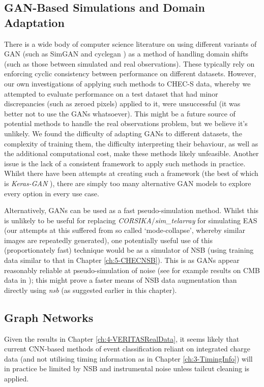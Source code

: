 \subsection{GAN-Based Simulations and Domain Adaptation}
There is a wide body of computer science literature on using different variants of GAN (such as SimGAN \cite{simgan} and cyclegan \cite{cyclegan}) as a method of handling domain shifts (such as those between simulated and real observations). These typically rely on enforcing cyclic consistency between performance on different datasets. However, our own investigations of applying such methods to CHEC-S data, whereby we attempted to evaluate performance on a test dataset that had minor discrepancies (such as zeroed pixels) applied to it, were unsuccessful (it was better not to use the GANs whatsoever). This might be a future source of potential methods to handle the real observations problem, but we believe it's unlikely. We found the difficulty of adapting GANs to different datasets, the complexity of training them, the difficulty interpreting their behaviour, as well as the additional computational cost, make these methods likely unfeasible. Another issue is the lack of a consistent framework to apply such methods in practice. Whilst there have been attempts at creating such a framework (the best of which is \textit{Keras-GAN} \cite{kerasgan}), there are simply too many alternative GAN models to explore every option in every use case. 

Alternatively, GANs can be used as a fast pseudo-simulation method. Whilst this is unlikely to be useful for replacing \textit{CORSIKA}/\textit{sim\_telarray} for simulating EAS (our attempts at this suffered from so called `mode-collapse', whereby similar images are repeatedly generated), one potentially useful use of this (proportionately fast) technique would be as a simulator of NSB (using training data similar to that in Chapter \ref{ch:5-CHECNSB}). This is as GANs appear reasonably reliable at pseudo-simulation of noise (see for example results on CMB data in \cite{darshgan}); this might prove a faster means of NSB data augmentation than directly using \textit{nsb} (as suggested earlier in this chapter). 

\subsection{Graph Networks}
Given the results in Chapter \ref{ch:4-VERITASRealData}, it seems likely that current CNN-based methods of event classification reliant on integrated charge data (and not utilising timing information as in Chapter \ref{ch:3-TimingInfo}) will in practice be limited by NSB and instrumental noise unless tailcut cleaning is applied.

